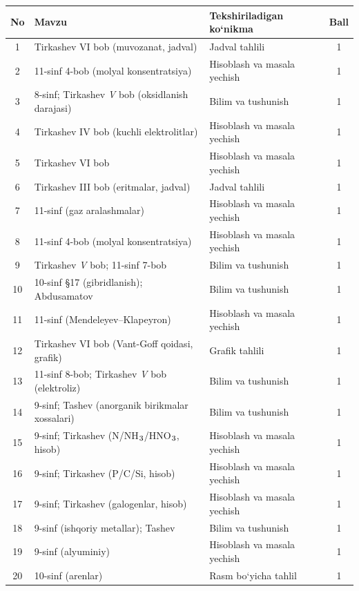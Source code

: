 \documentclass[11pt,a4paper]{article}
\renewcommand{\textsubscript}[1]{\ensuremath{_{\text{\fontsize{8}{8}\selectfont #1}}}}
\begin{document}
{\small\noindent\begin{longtable}{|c|p{7.2cm}|p{5.4cm}|c|}\hline \textbf{No} & \textbf{Mavzu} & \textbf{Tekshiriladigan ko`nikma} & \textbf{Ball}\\\hline
1 & Tirkashev VI bob (muvozanat, jadval) & Jadval tahlili & 1\\\hline
2 & 11-sinf 4-bob (molyal konsentratsiya) & Hisoblash va masala yechish & 1\\\hline
3 & 8-sinf; Tirkashev \textit{V} bob (oksidlanish darajasi) & Bilim va tushunish & 1\\\hline
4 & Tirkashev IV bob (kuchli elektrolitlar) & Hisoblash va masala yechish & 1\\\hline
5 & Tirkashev VI bob & Hisoblash va masala yechish & 1\\\hline
6 & Tirkashev III bob (eritmalar, jadval) & Jadval tahlili & 1\\\hline
7 & 11-sinf (gaz aralashmalar) & Hisoblash va masala yechish & 1\\\hline
8 & 11-sinf 4-bob (molyal konsentratsiya) & Hisoblash va masala yechish & 1\\\hline
9 & Tirkashev \textit{V} bob; 11-sinf 7-bob & Bilim va tushunish & 1\\\hline
10 & 10-sinf \S{}17 (gibridlanish); Abdusamatov & Bilim va tushunish & 1\\\hline
11 & 11-sinf (Mendeleyev--Klapeyron) & Hisoblash va masala yechish & 1\\\hline
12 & Tirkashev VI bob (Vant-Goff qoidasi, grafik) & Grafik tahlili & 1\\\hline
13 & 11-sinf 8-bob; Tirkashev \textit{V} bob (elektroliz) & Bilim va tushunish & 1\\\hline
14 & 9-sinf; Tashev (anorganik birikmalar xossalari) & Bilim va tushunish & 1\\\hline
15 & 9-sinf; Tirkashev (N/NH\textsubscript{3}/HNO\textsubscript{3}, hisob) & Hisoblash va masala yechish & 1\\\hline
16 & 9-sinf; Tirkashev (P/C/Si, hisob) & Hisoblash va masala yechish & 1\\\hline
17 & 9-sinf; Tirkashev (galogenlar, hisob) & Hisoblash va masala yechish & 1\\\hline
18 & 9-sinf (ishqoriy metallar); Tashev & Bilim va tushunish & 1\\\hline
19 & 9-sinf (alyuminiy) & Hisoblash va masala yechish & 1\\\hline
20 & 10-sinf (arenlar) & Rasm bo`yicha tahlil & 1\\\hline

\end{longtable}}
\end{document}
